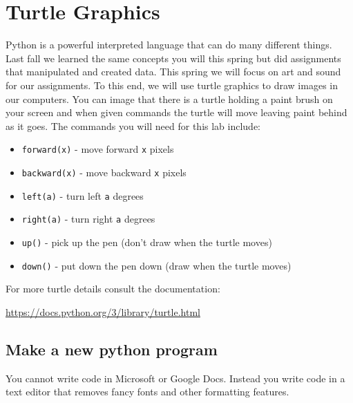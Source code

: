 \documentclass[12pt]{article}
\begin{document}
\section{Turtle Graphics}
Python is a powerful interpreted language that can do many different things. Last fall we learned the same concepts you will this spring but did assignments that manipulated and created data. This spring we will focus on art and sound for our assignments.
To this end, we will use turtle graphics to draw images in our computers.
You can image that there is a turtle holding a paint brush on your screen and when given commands the turtle will move leaving paint behind as it goes.
The commands you will need for this lab include: 

\begin{itemize}
\item \texttt{forward(x)} - move forward \texttt{x} pixels
\item \texttt{backward(x)} - move backward \texttt{x} pixels
\item \texttt{left(a)} - turn left \texttt{a} degrees
\item \texttt{right(a)} - turn right \texttt{a} degrees
\item \texttt{up()} - pick up the pen (don't draw when the turtle moves)
\item \texttt{down()} - put down the pen down (draw when the turtle moves)
\end{itemize}

For more turtle details consult the documentation:

\url{https://docs.python.org/3/library/turtle.html}

\subsection{Make a new python program}
You cannot write code in Microsoft or Google Docs. Instead you write code in a text editor that removes fancy fonts and other formatting features.
\end{document}
